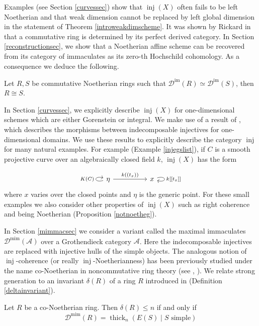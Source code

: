 \documentclass[12pt,oneside]{amsart}
\DeclareMathOperator{\thick}{thick}
\DeclareMathOperator{\inj}{inj}
\DeclareMathOperator{\immac}{im}
\DeclareMathOperator{\mimmac}{mim}
\begin{document}
Examples (see Section \ref{curvessec}) show that $\inj(X)$ often fails to be left Noetherian and that weak dimension cannot be replaced by left global dimension in the statement of Theorem \ref{introweakdimscheme}. 
It was shown by Rickard in \cite{Ric89} that a commutative ring is determined by its perfect derived category. In Section \ref{reconstructionsec}, we show that a Noetherian affine scheme can be recovered from its category of immaculates as its zero-th Hochschild cohomology. As a consequence we deduce the following. 

\begin{theorem} Let $R,S$ be commutative Noetherian rings such that $\mathcal{D}^{\immac}(R) \simeq \mathcal{D}^{\immac}(S)$,  then $R \cong S$. 
\end{theorem}

In Section \ref{curvessec}, we explicitly describe $\inj(X)$ for one-dimensional schemes which are either Gorenstein or integral. We make use of a result of \cite{Sch15}, which describes the morphisms between indecomposable injectives for one-dimensional domains. We use these results to explicitly describe the category $\inj$ for many natural examples. For example (Example  \ref{injegslist}), if $C$ is a smooth projective curve over an algebraically closed field $k$, $\inj(X)$ has the form

\[
\begin{tikzcd}[column sep = huge]
\eta \arrow[r,"{k((t_x))}"] \arrow[loop left,"K(C)"] & x \arrow[loop right, "{k[[t_x]]}"]
\end{tikzcd}
\]
where $x$ varies over the closed points and $\eta$ is the generic point. For these small examples we also consider other properties of $\inj(X)$ such as right coherence and being Noetherian (Proposition \ref{notnoetheg}). 

In Section \ref{mimmacsec} we consider a variant called the maximal immaculates $\mathcal{D}^{\mimmac}(\mathcal{A})$ over a Grothendieck category $\mathcal{A}$. Here the indecomposable injectives are replaced with injective hulls of the simple objects. The analogous notion of $\inj$-coherence (or really $\inj$-Noetherianness) has been previously studied under the name co-Noetherian in noncommutative ring theory (see \cite{Jan69}, \cite{Vam68}). We relate strong generation to an invariant $\delta(R)$ of a ring $R$ introduced in \cite{Fac82} (Definition \ref{deltainvariant}). 

\begin{theorem}
Let $R$ be a co-Noetherian ring. Then $\delta(R) \leq n$ if and only if
\[
\mathcal{D}^{\mimmac}(R) = \thick_n(E(S) \mid S \text{ simple})
\]
\end{theorem}
\end{document}
